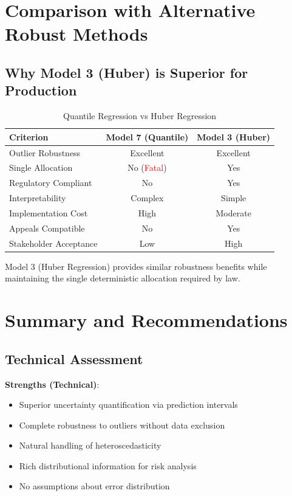 \section{Comparison with Alternative Robust Methods}

\subsection{Why Model 3 (Huber) is Superior for Production}

\begin{table}[h]
\centering
\caption{Quantile Regression vs Huber Regression}
\begin{tabular}{lcc}
\toprule
\textbf{Criterion} & \textbf{Model 7 (Quantile)} & \textbf{Model 3 (Huber)} \\
\midrule
Outlier Robustness & Excellent & Excellent \\
Single Allocation & No (\textcolor{red}{Fatal}) & Yes \\
Regulatory Compliant & No & Yes \\
Interpretability & Complex & Simple \\
Implementation Cost & High & Moderate \\
Appeals Compatible & No & Yes \\
Stakeholder Acceptance & Low & High \\
\bottomrule
\end{tabular}
\end{table}

Model 3 (Huber Regression) provides similar robustness benefits while maintaining the single deterministic allocation required by law.

\section{Summary and Recommendations}

\subsection{Technical Assessment}

\textbf{Strengths (Technical)}:
\begin{itemize}
    \item Superior uncertainty quantification via prediction intervals
    \item Complete robustness to outliers without data exclusion
    \item Natural handling of heteroscedasticity
    \item Rich distributional information for risk analysis
    \item No assumptions about error distribution
\end{itemize}

